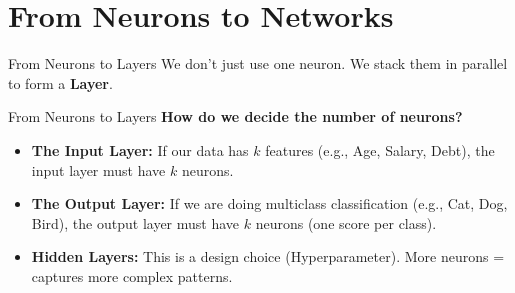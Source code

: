 \section{From Neurons to Networks}
\begin{frame}{From Neurons to Layers}
    We don't just use one neuron. We stack them in parallel to form a \textbf{Layer}.

    \centering
    
    
\end{frame}

\begin{frame}{From Neurons to Layers}
    \textbf{How do we decide the number of neurons?}
    
    \vspace{1em}
    \begin{itemize}
        \setlength\itemsep{1.5em}
        \item \textbf{The Input Layer:}
        If our data has $k$ features (e.g., Age, Salary, Debt), the input layer must have $k$ neurons.
        
        \item \textbf{The Output Layer:}
        If we are doing multiclass classification (e.g., Cat, Dog, Bird), the output layer must have $k$ neurons (one score per class).
        
        \item \textbf{Hidden Layers:}
        This is a design choice (Hyperparameter). More neurons = captures more complex patterns.
    \end{itemize}
\end{frame}

